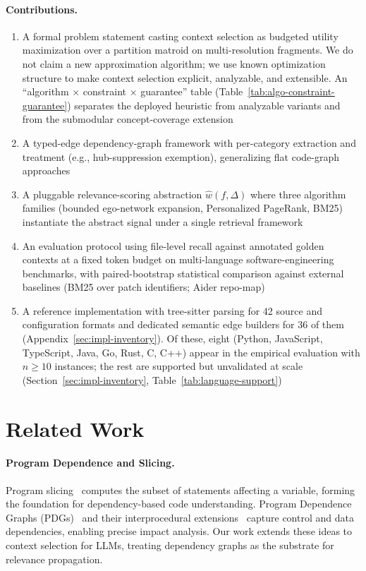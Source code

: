 \documentclass[11pt, a4paper]{article}
\begin{document}
\paragraph{Contributions.}
\begin{enumerate}
    \item A formal problem statement casting context selection as budgeted utility maximization over a partition matroid on multi-resolution fragments. We do not claim a new approximation algorithm; we use known optimization structure to make context selection explicit, analyzable, and extensible. An ``algorithm $\times$ constraint $\times$ guarantee'' table (Table~\ref{tab:algo-constraint-guarantee}) separates the deployed heuristic from analyzable variants and from the submodular concept-coverage extension
    \item A typed-edge dependency-graph framework with per-category extraction and treatment (e.g., hub-suppression exemption), generalizing flat code-graph approaches
    \item A pluggable relevance-scoring abstraction $\hat{w}(f, \Delta)$ where three algorithm families (bounded ego-network expansion, Personalized PageRank, BM25) instantiate the abstract signal under a single retrieval framework
    \item An evaluation protocol using file-level recall against annotated golden contexts at a fixed token budget on multi-language software-engineering benchmarks, with paired-bootstrap statistical comparison against external baselines (BM25 over patch identifiers; Aider repo-map)
    \item A reference implementation with tree-sitter parsing for 42 source and configuration formats and dedicated semantic edge builders for 36 of them (Appendix~\ref{sec:impl-inventory}). Of these, eight (Python, JavaScript, TypeScript, Java, Go, Rust, C, C++) appear in the empirical evaluation with $n{\geq}10$ instances; the rest are supported but unvalidated at scale (Section~\ref{sec:impl-inventory}, Table~\ref{tab:language-support})
\end{enumerate}

\newpage
\section{Related Work}

\paragraph{Program Dependence and Slicing.}
Program slicing~\cite{weiser1984program} computes the subset of statements affecting a variable, forming the foundation for dependency-based code understanding. Program Dependence Graphs (PDGs)~\cite{ferrante1987program} and their interprocedural extensions~\cite{horwitz1990interprocedural} capture control and data dependencies, enabling precise impact analysis. Our work extends these ideas to context selection for LLMs, treating dependency graphs as the substrate for relevance propagation.
\end{document}
